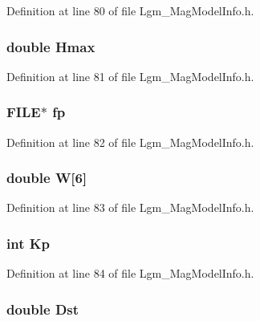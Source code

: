 Definition at line 80 of file Lgm\_\-MagModelInfo.h.\hypertarget{struct_lgm___mag_model_info_d8e5a89709cc62b7538c1429c0bea670}{
\subsubsection[{Hmax}]{\setlength{\rightskip}{0pt plus 5cm}double {\bf Hmax}}}
\label{struct_lgm___mag_model_info_d8e5a89709cc62b7538c1429c0bea670}




Definition at line 81 of file Lgm\_\-MagModelInfo.h.\hypertarget{struct_lgm___mag_model_info_a065f30aa9f5f9a42132c82c787ee70b}{
\subsubsection[{fp}]{\setlength{\rightskip}{0pt plus 5cm}FILE$\ast$ {\bf fp}}}
\label{struct_lgm___mag_model_info_a065f30aa9f5f9a42132c82c787ee70b}




Definition at line 82 of file Lgm\_\-MagModelInfo.h.\hypertarget{struct_lgm___mag_model_info_c186dbd58445ff8691db0f437f862a54}{
\subsubsection[{W}]{\setlength{\rightskip}{0pt plus 5cm}double {\bf W}\mbox{[}6\mbox{]}}}
\label{struct_lgm___mag_model_info_c186dbd58445ff8691db0f437f862a54}




Definition at line 83 of file Lgm\_\-MagModelInfo.h.\hypertarget{struct_lgm___mag_model_info_c660713cdd5b69708fe7c4866be48b53}{
\subsubsection[{Kp}]{\setlength{\rightskip}{0pt plus 5cm}int {\bf Kp}}}
\label{struct_lgm___mag_model_info_c660713cdd5b69708fe7c4866be48b53}




Definition at line 84 of file Lgm\_\-MagModelInfo.h.\hypertarget{struct_lgm___mag_model_info_521a6affefa837861b71a21b021b109b}{
\subsubsection[{Dst}]{\setlength{\rightskip}{0pt plus 5cm}double {\bf Dst}}}
\label{struct_lgm___mag_model_info_521a6affefa837861b71a21b021b109b}




